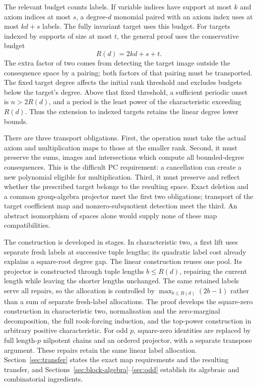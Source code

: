 \documentclass[11pt,a4paper]{article}
\theoremstyle{definition}\newtheorem{definition}[theorem]{Definition}
\theoremstyle{remark}\newtheorem{remark}[theorem]{Remark}
\begin{document}
The relevant budget counts labels. If variable indices have support
at most $k$ and axiom indices at most $s$, a degree-$d$ monomial
paired with an axiom index uses at most $kd+s$ labels. The fully
invariant target uses this budget. For targets indexed by supports
of size at most $t$, the general proof uses the conservative budget
\[
                             R(d)=2kd+s+t.
\]
The extra factor of two comes from detecting the target image outside
the consequence space by a pairing; both factors of that pairing
must be transported. The fixed target degree affects the initial
rank threshold and excludes budgets below the target's degree.
Above that fixed threshold, a sufficient periodic onset is
$n>2R(d)$, and a period is the least power of the characteristic
exceeding $R(d)$. Thus the extension to indexed targets retains
the linear degree lower bounds.

There are three transport obligations. First, the operation must take
the actual axiom and multiplication maps to those at the smaller
rank. Second, it must preserve the sums, images and intersections
which compute all bounded-degree consequences. This is the difficult
PC requirement: a cancellation can create a new polynomial eligible
for multiplication. Third, it must preserve and reflect whether the
prescribed target belongs to the resulting space. Exact deletion and
a common group-algebra projector meet the first two obligations;
transport of the target coefficient map and nonzero-subquotient
detection meet the third. An abstract isomorphism of spaces alone
would supply none of these map compatibilities.

The construction is developed in stages. In characteristic two, a
first lift uses separate fresh labels at successive tuple lengths;
its quadratic label cost already explains a square-root degree gap.
The linear construction reuses one pool. Its projector is constructed
through tuple lengths $b\le R(d)$,
repairing the current length while leaving the shorter lengths
unchanged. The same retained labels serve all repairs, so the
allocation is controlled by $\max_{b\le R(d)}(2b-1)$ rather than
a sum of separate fresh-label allocations. The proof develops the
square-zero construction in characteristic two, normalisation and
the zero-marginal decomposition, the full rook-forcing induction,
and the top-power construction in arbitrary positive characteristic.
For odd $p$, square-zero identities are replaced by full length-$p$
nilpotent chains and an ordered projector, with a separate transpose
argument. These repairs retain the same linear label allocation.
Section~\ref{sec:transfer} states the exact map requirements and
the resulting transfer, and
Sections~\ref{sec:block-algebra}--\ref{sec:odd} establish its algebraic
and combinatorial ingredients.
\end{document}
